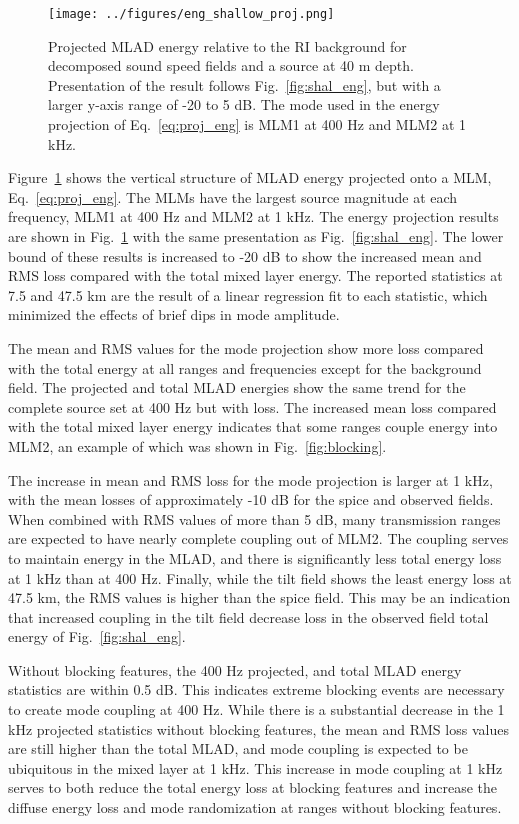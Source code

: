 \documentclass[preprint,NumberedRefs]{JASA}
\begin{document}
\begin{figure}
\texttt{[image: ../figures/eng\_shallow\_proj.png]}
    \caption{Projected MLAD energy relative to the RI background for decomposed sound speed fields and a source at 40 m depth. Presentation of the result follows Fig.~\ref{fig:shal_eng}, but with a larger y-axis range of -20 to 5 dB. The mode used in the energy projection of Eq.~\eqref{eq:proj_eng} is MLM1 at 400 Hz and MLM2 at 1 kHz.}
    \label{fig:shal_proj}
\end{figure}
Figure~\ref{fig:shal_proj} shows the vertical structure of MLAD energy projected onto a MLM, Eq.~\eqref{eq:proj_eng}. The MLMs have the largest source magnitude at each frequency, MLM1 at 400 Hz and MLM2 at 1 kHz. The energy projection results are shown in Fig.~\ref{fig:shal_proj} with the same presentation as Fig.~\ref{fig:shal_eng}. The lower bound of these results is increased to -20 dB to show the increased mean and RMS loss compared with the total mixed layer energy. The reported statistics at 7.5 and 47.5 km are the result of a linear regression fit to each statistic, which minimized the effects of brief dips in mode amplitude.

The mean and RMS values for the mode projection show more loss compared with the total energy at all ranges and frequencies except for the background field. The projected and total MLAD energies show the same trend for the complete source set at 400 Hz but with loss. The increased mean loss compared with the total mixed layer energy indicates that some ranges couple energy into MLM2, an example of which was shown in Fig.~\ref{fig:blocking}.

The increase in mean and RMS loss for the mode projection is larger at 1 kHz, with the mean losses of approximately -10 dB for the spice and observed fields. When combined with RMS values of more than 5 dB, many transmission ranges are expected to have nearly complete coupling out of MLM2. The coupling serves to maintain energy in the MLAD, and there is significantly less total energy loss at 1 kHz than at 400 Hz. Finally, while the tilt field shows the least energy loss at 47.5 km, the RMS values is higher than the spice field. This may be an indication that increased coupling in the tilt field decrease loss in the observed field total energy of Fig.~\ref{fig:shal_eng}.

Without blocking features, the 400 Hz projected, and total MLAD energy statistics are within 0.5 dB. This indicates extreme blocking events are necessary to create mode coupling at 400 Hz. While there is a substantial decrease in the 1 kHz projected statistics without blocking features, the mean and RMS loss values are still higher than the total MLAD, and mode coupling is expected to be ubiquitous in the mixed layer at 1 kHz. This increase in mode coupling at 1 kHz serves to both reduce the total energy loss at blocking features and increase the diffuse energy loss and mode randomization at ranges without blocking features.
\end{document}
